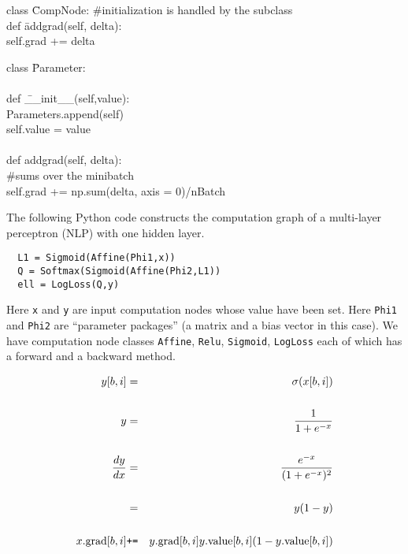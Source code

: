 {\vfill
\begin{tabbing}
class \=CompNode: \#initialization is handled by the subclass \\
   \>def \=addgrad(self, delta): \\
   \>\>self.grad += delta
\end{tabbing}

\slide{}

\begin{tabbing}
class \=Parameter: \\
    \\
    \>def \=\_\_init\_\_(self,value): \\
        \>\>Parameters.append(self) \\
        \>\>self.value = value \\
\\
    \>def \>addgrad(self, delta): \\
          \>\>\#sums over the minibatch \\
    \>\>self.grad += np.sum(delta, axis = 0)/nBatch \\
\end{tabbing}

\medskip

The following Python code constructs the computation graph of a multi-layer perceptron (NLP) with one hidden layer.

\vfill
\begin{verbatim}
  L1 = Sigmoid(Affine(Phi1,x))
  Q = Softmax(Sigmoid(Affine(Phi2,L1))
  ell = LogLoss(Q,y)
\end{verbatim}

\vfill
Here {\tt x} and {\tt y} are input computation nodes
whose value have been set.
Here {\tt Phi1} and {\tt Phi2} are ``parameter packages'' (a matrix and a bias vector in this case).
We have computation node classes {\tt Affine}, {\tt Relu}, {\tt Sigmoid}, {\tt LogLoss} each of which has
a forward and a backward method.


\begin{eqnarray*}
y[b,i] & = &  \sigma(x[b,i]) \\
\\
y & = & \frac{1}{1 + e^{-x}} \\
\\
\frac{d y}{dx} & = & \frac{e^{-x}}{(1 + e^{-x})^2} \\
\\
& = & y(1-y) \\
\\
x.\mathrm{grad}[b,i] & \mbox{\tt +=} & y.\mathrm{grad}[b,i]y.\mathrm{value}[b,i](1-y.\mathrm{value}[b,i])
\end{eqnarray*}



}
